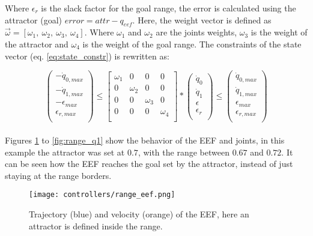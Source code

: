 Where $\epsilon_r$ is the slack factor for the goal range, the error is calculated using the attractor (goal) $error = attr - q_{eef}$. Here, the weight vector is defined as $\vec{\omega} = [ \omega_{1},\ \omega_{2},\ \omega_{3},\ \omega_{4} ]$. Where $\omega_{1}$ and $\omega_{2}$ are the joints weights, $\omega_{3}$ is the weight of the attractor and $\omega_{4}$ is the weight of the goal range. The constraints of the state vector (eq. \ref{eq:state_constr}) is rewritten as:

$$
\left( \begin{array}{c}
-\dot{q}_{0,max} \\
-\dot{q}_{1,max} \\
-\epsilon_{max} \\
\epsilon_{r,max} \\
\end{array}
\right)	\leq 
\left[ \begin{array}{cccc}
\omega_{1} & 0 & 0 & 0 \\
0 & \omega_{2} & 0 & 0 \\
0 & 0 & \omega_{3} & 0 \\
0 & 0 & 0 & \omega_{4} \\
\end{array}
\right] *
\left( \begin{array}{c}
\dot{q}_{0} \\
\dot{q}_{1} \\
\epsilon \\
\epsilon_r \\
\end{array}
\right) 
\leq \left( \begin{array}{c}
\dot{q}_{0,max} \\
\dot{q}_{1,max} \\
\epsilon_{max} \\
\epsilon_{r,max} \\
\end{array}
\right)
$$
\\
Figures \ref{fig:range_eef} to \ref{fig:range_q1} show the behavior of the EEF and joints, in this example the attractor was set at $0.7$, with the range between $0.67$ and $0.72$. It can be seen how the EEF reaches the goal set by the attractor, instead of just staying at the range borders. 
\begin{figure}[H]
	\centering
	\texttt{[image: controllers/range\_eef.png]}
	\vspace{-10pt}
	\caption[Position range with attractor: EEF]{Trajectory (blue) and velocity (orange) of the EEF, here an attractor is defined inside the range.}
	\vspace{-15pt}
	\label{fig:range_eef}
\end{figure}
